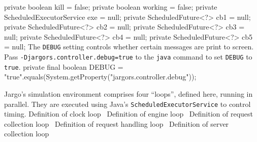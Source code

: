 private boolean kill = false;
private boolean working = false;
private ScheduledExecutorService exe = null;
private ScheduledFuture<?> cb1 = null;
private ScheduledFuture<?> cb2 = null;
private ScheduledFuture<?> cb3 = null;
private ScheduledFuture<?> cb4 = null;
private ScheduledFuture<?> cb5 = null;
\nwendcode{}\nwdocspar
The {\tt{}DEBUG} setting controls whether certain messages are print to screen.
Pass {\tt{}-Djargors.controller.debug=true} to the {\tt{}java} command to set
{\tt{}DEBUG} to {\tt{}true}.
\nwenddocs{}\plusendmoddef
private final boolean DEBUG =
    "true".equals(System.getProperty("jargors.controller.debug"));
\nwendcode{}\nwdocspar

 Jargo's simulation environment comprises four ``loops'', defined
here, running in parallel. They are executed using Java's
{\tt{}ScheduledExecutorService} to control timing.
\nwenddocs{}\endmoddef{}
\LA{}Definition of clock loop~{\nwtagstyle{}}\RA{}
\LA{}Definition of engine loop~{\nwtagstyle{}}\RA{}
\LA{}Definition of request collection loop~{\nwtagstyle{}}\RA{}
\LA{}Definition of request handling loop~{\nwtagstyle{}}\RA{}
\LA{}Definition of server collection loop~{\nwtagstyle{}}\RA{}
\nwendcode{}\nwdocspar

